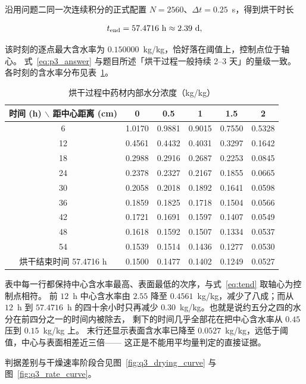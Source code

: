 沿用问题二同一次连续积分的正式配置 $N=2560$、$\Delta t=0.25$~s，得到烘干时长

\begin{equation}\label{eq:p3_answer}
t_{\rm end}=57.4716~\mathrm{h}\approx 2.39~\mathrm{d},
\end{equation}

该时刻的逐点最大含水率为 $0.150000$~kg/kg，恰好落在阈值上，控制点位于轴心。
式~\eqref{eq:p3_answer} 与题目所述「烘干过程一般持续 2--3 天」的量级一致。
各时刻的含水率分布见表~\ref{tab:p3_C}。

\begin{table}[H]
\centering
\caption{烘干过程中药材内部水分浓度（kg/kg）}\label{tab:p3_C}
\begin{tabular}{cccccc}
\toprule
时间 (h) $\backslash$ 距中心距离 (cm) & 0 & 0.5 & 1 & 1.5 & 2 \\
\midrule
6  & 1.0170 & 0.9881 & 0.9015 & 0.7550 & 0.5328 \\
12 & 0.4561 & 0.4432 & 0.4031 & 0.3297 & 0.1642 \\
18 & 0.2988 & 0.2916 & 0.2687 & 0.2253 & 0.0845 \\
24 & 0.2378 & 0.2327 & 0.2167 & 0.1855 & 0.0665 \\
30 & 0.2058 & 0.2018 & 0.1892 & 0.1641 & 0.0598 \\
36 & 0.1859 & 0.1825 & 0.1718 & 0.1504 & 0.0566 \\
42 & 0.1721 & 0.1691 & 0.1597 & 0.1407 & 0.0549 \\
48 & 0.1618 & 0.1592 & 0.1507 & 0.1334 & 0.0537 \\
54 & 0.1539 & 0.1514 & 0.1436 & 0.1277 & 0.0530 \\
烘干结束时间 57.4716 h & 0.1500 & 0.1477 & 0.1402 & 0.1249 & 0.0527 \\
\bottomrule
\end{tabular}
\end{table}

表中每一行都保持中心含水率最高、表面最低的次序，与式~\eqref{eq:tend} 取轴心为控制点相符。
前 $12$~h 中心含水率由 $2.55$ 降至 $0.4561$~kg/kg，减少了八成；而从 $12$~h 到 $57.4716$~h
的四十余小时只再减少 $0.30$~kg/kg。也就是说约五分之四的水分在前四分之一的时间内被除去，
剩下的时间几乎全部花在把中心含水率从 $0.45$ 压到 $0.15$~kg/kg 上。
末行还显示表面含水率已降至 $0.0527$~kg/kg，远低于阈值，中心与表面相差近三倍——
这正是不能用平均量判定的直接证据。

判据差别与干燥速率阶段合见图~\ref{fig:q3_drying_curve} 与图~\ref{fig:q3_rate_curve}。

